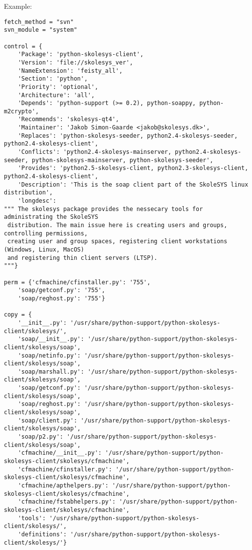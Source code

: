 Example:
\begin{verbatim}
fetch_method = "svn"
svn_module = "system"

control = {
	'Package': 'python-skolesys-client',
	'Version': 'file://skolesys_ver',
	'NameExtension': 'feisty_all',
	'Section': 'python',
	'Priority': 'optional',
	'Architecture': 'all',
	'Depends': 'python-support (>= 0.2), python-soappy, python-m2crypto',
	'Recommends': 'skolesys-qt4',
	'Maintainer': 'Jakob Simon-Gaarde <jakob@skolesys.dk>',
	'Replaces': 'python-skolesys-seeder, python2.4-skolesys-seeder, python2.4-skolesys-client',
	'Conflicts': 'python2.4-skolesys-mainserver, python2.4-skolesys-seeder, python-skolesys-mainserver, python-skolesys-seeder',
	'Provides': 'python2.5-skolesys-client, python2.3-skolesys-client, python2.4-skolesys-client',
	'Description': 'This is the soap client part of the SkoleSYS linux distribution',
	'longdesc': 
""" The skolesys package provides the nessecary tools for administrating the SkoleSYS
 distribution. The main issue here is creating users and groups, controlling permissions,
 creating user and group spaces, registering client workstations (Windows, Linux, MacOS)
 and registering thin client servers (LTSP).
"""}

perm = {'cfmachine/cfinstaller.py': '755',
	'soap/getconf.py': '755',
	'soap/reghost.py': '755'}

copy = {
	'__init__.py': '/usr/share/python-support/python-skolesys-client/skolesys/',
	'soap/__init__.py': '/usr/share/python-support/python-skolesys-client/skolesys/soap',
	'soap/netinfo.py': '/usr/share/python-support/python-skolesys-client/skolesys/soap',
	'soap/marshall.py': '/usr/share/python-support/python-skolesys-client/skolesys/soap',
	'soap/getconf.py': '/usr/share/python-support/python-skolesys-client/skolesys/soap',
	'soap/reghost.py': '/usr/share/python-support/python-skolesys-client/skolesys/soap',
	'soap/client.py': '/usr/share/python-support/python-skolesys-client/skolesys/soap',
	'soap/p2.py': '/usr/share/python-support/python-skolesys-client/skolesys/soap',
	'cfmachine/__init__.py': '/usr/share/python-support/python-skolesys-client/skolesys/cfmachine',
	'cfmachine/cfinstaller.py': '/usr/share/python-support/python-skolesys-client/skolesys/cfmachine',
	'cfmachine/apthelpers.py': '/usr/share/python-support/python-skolesys-client/skolesys/cfmachine',
	'cfmachine/fstabhelpers.py': '/usr/share/python-support/python-skolesys-client/skolesys/cfmachine',
	'tools': '/usr/share/python-support/python-skolesys-client/skolesys/',
	'definitions': '/usr/share/python-support/python-skolesys-client/skolesys/'}


\end{verbatim}
